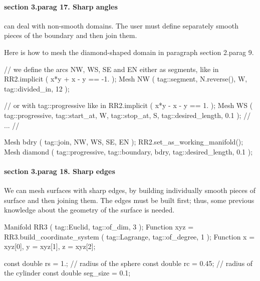 \paragraph{\numb section 3.\numb parag 17. Sharp angles}

{\ManiFEM} can deal with non-smooth domains.
The user must define separately smooth pieces of the boundary and then join them.

Here is how to mesh the diamond-shaped domain in paragraph \numb section 2.\numb parag 9.

\verbatim
   // we define the arcs NW, WS, SE and EN either as segments, like in
   RR2.implicit ( x*y + x - y == -1. );
   Mesh NW ( tag::segment, N.reverse(), W, tag::divided_in, 12 );
   
   // or with tag::progressive like in
   RR2.implicit ( x*y - x - y ==  1. );
   Mesh WS ( tag::progressive, tag::start_at, W, tag::stop_at, S,
             tag::desired_length, 0.1 );
   // ... //
             
   Mesh bdry ( tag::join, NW, WS, SE, EN );
   RR2.set_as_working_manifold();
   Mesh diamond ( tag::progressive, tag::boundary, bdry, tag::desired_length, 0.1 );
\endverbatim





\paragraph{\numb section 3.\numb parag 18. Sharp edges}

We can mesh surfaces with sharp edges, by building individually smooth pieces of surface
and then {\codett join}ing them.
The edges must be built first;
thus, some previous knowledge about the geometry of the surface is needed.

\verbatim
   Manifold RR3 ( tag::Euclid, tag::of_dim, 3 );
   Function xyz = RR3.build_coordinate_system ( tag::Lagrange, tag::of_degree, 1 );
   Function x = xyz[0],  y = xyz[1],  z = xyz[2];

   const double rs = 1.;    // radius of the sphere
   const double rc = 0.45;  // radius of the cylinder
   const double seg_size = 0.1;

